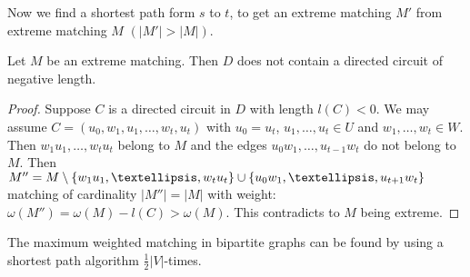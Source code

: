 Now we find a shortest path form $s$ to $t$, to get an extreme matching $M'$ 
from extreme matching $M$ $(|M'| > |M|)$.

\begin{thm}
	Let $M$ be an extreme matching. Then $D$ does not contain a directed circuit 
	of negative length.
\end{thm}

\begin{proof}
	Suppose $C$ is a directed circuit in $D$ with length $l(C) < 0$. We may assume 
	$C=(u_0, w_1, u_1, …, w_t, u_t)$ with $u_0=u_t$, $u_1, …, u_t \in U$ and 
	$w_1, …, w_t \in W$. Then $w_1u_1, …, w_tu_t$ belong to $M$ and the edges 
	$u_0w_1, …, u_{t-1}w_t$ do not belong to $M$.
	Then $M''=M\setminus \plainset{w_1u_1, …, w_tu_t} \cup \plainset{u_0w_1, …, u_{t+1}w_t}$
	matching of cardinality $|M''| = |M|$ with weight: $\omega(M'') = \omega(M) - l(C) > \omega(M)$.
	This contradicts to $M$ being extreme.
\end{proof}

\begin{cor}
	The maximum weighted matching in bipartite graphs can be found by using a 
	shortest path algorithm $\frac{1}{2}|V|$-times.
\end{cor}
